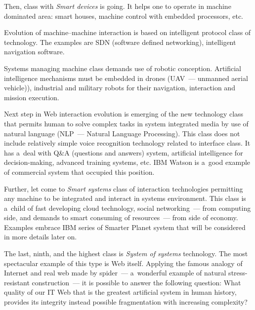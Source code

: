 \begin{multicols}{2}
 Then, class with \textit{Smart devices} is going. It helps one to operate in machine dominated area: smart
houses, machine control with embedded processors, etc.

 Evolution of machine--machine interaction is based on intelligent protocol class of technology. The
examples are SDN (software defined networking), intelligent navigation software.

 Systems managing machine class demands use of robotic conception. Artificial intelligence mechanisms
must be embedded in drones (UAV~--- unmanned aerial vehicle)), industrial and military robots for their navigation, interaction and
mission execution.

 Next step in Web interaction evolution is emerging of the new technology class that permits human to
solve complex tasks in system integrated media by use of natural language
(NLP~--- Natural Language
Processing). This class does not include relatively simple voice recognition technology related to interface
class.  It has a~deal with Q\&A (questions and answers)
system, artificial intelligence for decision-making, advanced training
systems, etc. IBM Watson is a~good example of commercial system
that occupied this position.

 Further, let come to \textit{Smart systems} class of interaction technologies permitting any machine
to be integrated and interact in systems environment. This class is a~child of fast developing cloud
technology, social networking~--- from computing side, and demands to smart consuming of resources~---
from side of economy. Examples embrace IBM series of Smarter Planet system that
will be considered in more details later on.

 The last, ninth, and the highest class is \textit{System of systems} technology. The most spectacular example of
this type is Web itself. Applying the famous analogy of Internet and real web made by spider~---
a~wonderful example of natural stress-resistant construction~---
it is possible to answer the following
question: What quality of our IT Web that is the greatest artificial system in human history, provides its
integrity instead possible fragmentation with increasing complexity?


\end{multicols}
